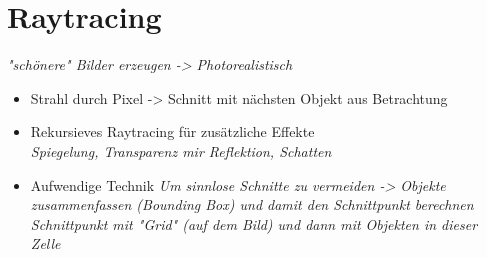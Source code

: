 \section{Raytracing}

\textit{"schönere" Bilder erzeugen -> Photorealistisch}

\begin{itemize}
	\item Strahl durch Pixel -> Schnitt mit nächsten Objekt aus Betrachtung

	\item Rekursieves Raytracing für zusätzliche Effekte \\
	\textit{Spiegelung, Transparenz mir Reflektion, Schatten}
	
	\item Aufwendige Technik
	\textit{Um sinnlose Schnitte zu vermeiden -> Objekte zusammenfassen (Bounding Box) und damit den Schnittpunkt berechnen}
	\textit{Schnittpunkt mit "Grid" (auf dem Bild) und dann mit Objekten in dieser Zelle}
\end{itemize}
